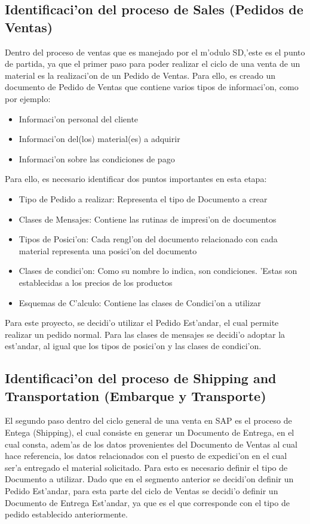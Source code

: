 \subsection{Identificaci'on del proceso de Sales (Pedidos de Ventas)}
	Dentro del proceso de ventas que es manejado por el m'odulo SD,'este es el punto de partida, ya que el primer paso para poder realizar el ciclo de una venta de un material es la realizaci'on de un Pedido de Ventas. Para ello, es creado un documento de Pedido de Ventas que contiene varios tipos de informaci'on, como por ejemplo:
\begin{itemize}
\item Informaci'on personal del cliente
\item Informaci'on del(los) material(es) a adquirir
\item Informaci'on sobre las condiciones de pago
\end{itemize}
	Para ello, es necesario identificar dos puntos importantes en esta etapa:
\begin{itemize}
\item Tipo de Pedido a realizar: Representa el tipo de Documento a crear
\item Clases de Mensajes: Contiene las rutinas de impresi'on de documentos
\item Tipos de Posici'on: Cada rengl'on del documento relacionado con cada material representa una posici'on del documento
\item Clases de condici'on: Como su nombre lo indica, son condiciones. 'Estas son establecidas a los precios de los productos
\item Esquemas de C'alculo: Contiene las clases de Condici'on a utilizar
\end{itemize}
	Para este proyecto, se decidi'o utilizar el Pedido Est'andar, el cual permite realizar un pedido normal. Para las clases de mensajes se decidi'o adoptar la est'andar, al igual que los tipos de posici'on y las clases de condici'on.
\subsection{Identificaci'on del proceso de Shipping and Transportation (Embarque y Transporte)}
	El segundo paso dentro del ciclo general de una venta en SAP es el proceso de Entega (Shipping), el cual consiste en generar un Documento de Entrega, en el cual consta, adem'as de los datos provenientes del Documento de Ventas al cual hace referencia, los datos relacionados con el puesto de expedici'on en el cual ser'a entregado el material solicitado. Para esto es necesario definir el tipo de Documento a utilizar. 
	Dado que en el segmento anterior se decidi'on definir un Pedido Est'andar, para esta parte del ciclo de Ventas se decidi'o definir un Documento de Entrega Est'andar, ya que es el que corresponde con el tipo de pedido establecido anteriormente.

